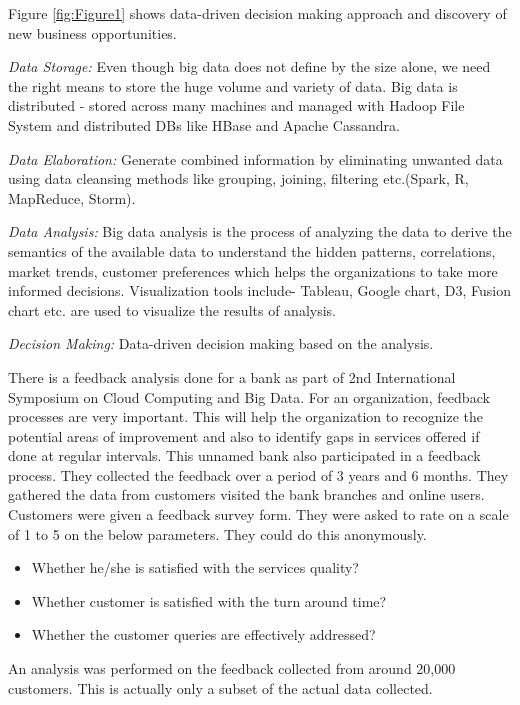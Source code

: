 \documentclass[sigconf]{acmart}
\begin{document}
Figure \ref{fig:Figure1} shows data-driven decision making approach and discovery of new business opportunities.

\textit{Data Storage:} Even though big data does not define by the size alone, we need the right means to store the huge volume and variety of data. Big data is distributed - stored across many machines and managed with Hadoop File System and distributed DBs like HBase and Apache Cassandra\cite{big-data-storage}.

\textit{Data Elaboration:} Generate combined information by eliminating unwanted data using data cleansing methods like grouping, joining, filtering etc.(Spark, R, MapReduce, Storm). 

\textit{Data Analysis:} Big data analysis is the process of analyzing the data to derive the semantics of the available data to understand the hidden patterns, correlations, market trends, customer preferences which helps the organizations to take more informed decisions. Visualization tools include- Tableau, Google chart, D3, Fusion chart etc. are used to visualize the results of analysis.

\textit{Decision Making:} Data-driven decision making based on the analysis.
 
 There is a feedback analysis done for a bank as part of 2nd International Symposium on Cloud Computing and Big Data. For an organization, feedback processes are very important. This will help the organization to recognize the potential areas of improvement and also to identify gaps in services offered if done at regular intervals. This unnamed bank also participated in a feedback process. They collected the feedback over a period of 3 years and 6 months. They gathered the data from customers visited the bank branches and online users. Customers were given a feedback survey form. They were asked to rate on a scale of 1 to 5 on the below parameters. They could do this anonymously. 
 
\begin{itemize}
   \item Whether he/she is satisfied with the services quality?
   \item Whether customer is satisfied with the turn around time?
   \item Whether the customer queries are effectively addressed?
\end{itemize}

An analysis was performed on the feedback collected from around 20,000 customers. This is actually only a subset of the actual data collected\cite{bigdata-banking}. 
\end{document}
